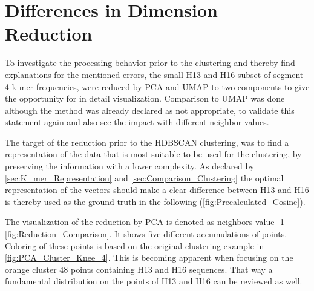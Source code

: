\section{Differences in Dimension Reduction} \label{sec:Dimension_Reduction}

To investigate the processing behavior prior to the clustering and thereby find explanations for the mentioned errors, the small H13 and H16 subset of segment 4 k-mer frequencies, were reduced by \gls{PCA} and \gls{UMAP} to two components to give the opportunity for in detail visualization. Comparison to \gls{UMAP} was done although the method was already declared as not appropriate, to validate this statement again and also see the impact with different neighbor values. 

The target of the reduction prior to the \gls{HDBSCAN} clustering, was to find a representation of the data that is most suitable to be used for the clustering, by preserving the information with a lower complexity. As declared by \autoref{sec:K_mer_Representation} and \autoref{sec:Comparison_Clustering} the optimal representation of the vectors should make a clear difference between H13 and H16 is thereby used as the ground truth in the following (\autoref{fig:Precalculated_Cosine}).

The visualization of the reduction by \gls{PCA} is denoted as neighbors value -1 \autoref{fig:Reduction_Comparison}. It shows five different accumulations of points. Coloring of these points is based on the original clustering example in \autoref{fig:PCA_Cluster_Knee_4}. This is becoming apparent when focusing on the orange cluster 48 points containing H13 and H16 sequences. That way a fundamental distribution on the points of H13 and H16 can be reviewed as well. 
%

